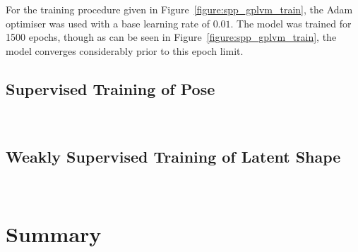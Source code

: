 For the training procedure given in Figure~\ref{figure:spp_gplvm_train}, the Adam~\cite{Kingma2014} 
optimiser was used with a base learning rate of \( 0.01 \). The model was trained for 1500 epochs, 
though as can be seen in Figure~\ref{figure:spp_gplvm_train}, the model converges considerably 
prior to this epoch limit.

\subsection{Supervised Training of Pose}
~\label{sec:spp_quantitative_pose_train}

\subsection{Weakly Supervised Training of Latent Shape}
~\label{sec:spp_quantitative_latentshape_train}

\section{Summary}
~\label{sec:spp_discussion}
